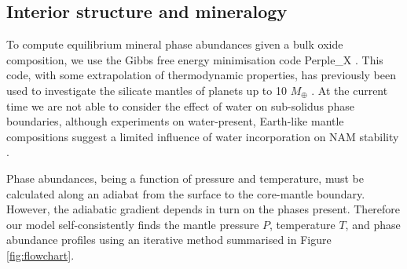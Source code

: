 \subsection{Interior structure and mineralogy}\label{sec:methods_structure}


To compute equilibrium mineral phase abundances given a bulk oxide composition, we use the Gibbs free energy minimisation code Perple\_X \citep{connolly_geodynamic_2009}. This code, with some extrapolation of thermodynamic properties, has previously been used to investigate the silicate mantles of planets up to 10 $M_\oplus$ \citep{dorn_can_2015, dorn_generalized_2017, dorn_new_2019, unterborn_inward_2018, hinkel_star_2018, unterborn_pressure_2019, otegi_impact_2020, wang_detailed_2022}. At the current time we are not able to consider the effect of water on sub-solidus phase boundaries, although experiments on water-present, Earth-like mantle compositions suggest a limited influence of water incorporation on NAM stability \citep[shifting the depth of phase boundaries by at most a few GPa;][]{litasov_influence_2006}.

Phase abundances, being a function of pressure and temperature, must be calculated along an adiabat from the surface to the core-mantle boundary. However, the adiabatic gradient depends in turn on the phases present. Therefore our model self-consistently finds the mantle pressure $P$, temperature $T$, and phase abundance profiles using an iterative method summarised in Figure \ref{fig:flowchart}. 


